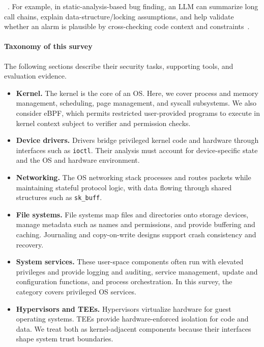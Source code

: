 ~\cite{chen2021evaluating}.
For example, in static-analysis-based bug finding, an LLM can summarize long call chains, explain data-structure/locking assumptions, and help validate whether an alarm is plausible by cross-checking code context and constraints~\cite{wen2024automatically}.


\paragraph{Taxonomy of this survey}
 The following sections describe their security tasks, supporting tools, and evaluation evidence.
\begin{itemize}
  \item \textbf{Kernel.} The kernel is the core of an OS. Here, we cover process and memory management, scheduling, page management, and syscall subsystems. We also consider eBPF, which permits restricted user-provided programs to execute in kernel context subject to verifier and permission checks.
  \item \textbf{Device drivers.} Drivers bridge privileged kernel code and hardware through interfaces such as \texttt{ioctl}. Their analysis must account for device-specific state and the OS and hardware environment.
  \item \textbf{Networking.} The OS networking stack processes and routes packets while maintaining stateful protocol logic, with data flowing through shared structures such as \texttt{sk\_buff}.
  \item \textbf{File systems.} File systems map files and directories onto storage devices, manage metadata such as names and permissions, and provide buffering and caching. Journaling and copy-on-write designs support crash consistency and recovery.
  \item \textbf{System services.} These user-space components often run with elevated privileges and provide logging and auditing, service management, update and configuration functions, and process orchestration. In this survey, the category covers privileged OS services.
  \item \textbf{Hypervisors and TEEs.} Hypervisors virtualize hardware for guest operating systems. TEEs provide hardware-enforced isolation for code and data. We treat both as kernel-adjacent components because their interfaces shape system trust boundaries.
\end{itemize}

